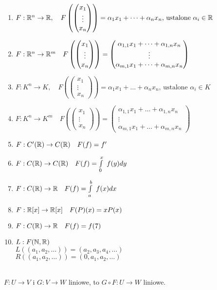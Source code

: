 \begin{przy}
    \hfill
    \begin{enumerate}[{(}1{)}]
        \item $F: \mathbb{R}^n \rightarrow \mathbb{R}, \quad F \left( \begin{pmatrix} x_1 \\ \vdots \\ x_n \end{pmatrix}\right) = \alpha_1 x_1 + \dots + \alpha_n x_n \text{, ustalone } \alpha_i \in \mathbb{R}$ 
        \item $F: \mathbb{R}^n \rightarrow \mathbb{R}^m  \quad F \left( \begin{pmatrix} x_1 \\ \vdots \\ x_n \end{pmatrix}\right) = \begin{pmatrix} \alpha_{1,1}x_1 + \dots + \alpha_{1,n} x_n\\ \vdots \\ \alpha_{m,1}x_1 + \dots + \alpha_{m,n} x_n \end{pmatrix}$
        \item $F: K^n \rightarrow K, \quad F \left( \begin{pmatrix} x_1 \\ \vdots \\ x_n \end{pmatrix}\right) = \alpha_1 x_1 + \dots + \alpha_n x_n \text{, ustalone } \alpha_i \in K$ 
        \item $F: K^n \rightarrow K^m  \quad F \left( \begin{pmatrix} x_1 \\ \vdots \\ x_n \end{pmatrix}\right) = \begin{pmatrix} \alpha_{1,1}x_1 + \dots + \alpha_{1,n} x_n\\ \vdots \\ \alpha_{m,1}x_1 + \dots + \alpha_{m,n} x_n \end{pmatrix}$
        \item $F : C'(\mathbb{R}) \rightarrow C(\mathbb{R}) \quad F(f) = f'$ 
        \item $F: C(\mathbb{R}) \rightarrow C(\mathbb{R}) \quad F(f) = \int\limits_0^x \ f(y) dy$ 
        \item $F: C(\mathbb{R}) \rightarrow \mathbb{R} \quad F(f) = \int\limits_a^b \ f(x) dx$ 
        \item $F: \mathbb{R} [x] \rightarrow \mathbb{R}[x] \quad F(P)(x) = xP(x)$
        \item $F: C(\mathbb{R}) \rightarrow \mathbb{R} \quad F(f) =f(7)$
        \item $L: F(\mathbb{N},\mathbb{R})  $ \\ 
        $L((a_1,a_2,\dots)) = (a_2,a_3,a_4,\dots)$ \\
        $R((a_1,a_2,\dots)) = (0,a_1,a_2,\dots)$ 
    \end{enumerate}
\end{przy}
\begin{ft} \hfill 
    \\
    $F: U \rightarrow V $ i $G: V \rightarrow W$ liniowe, to $G \circ F: U \rightarrow W $ liniowe. 
\end{ft}

